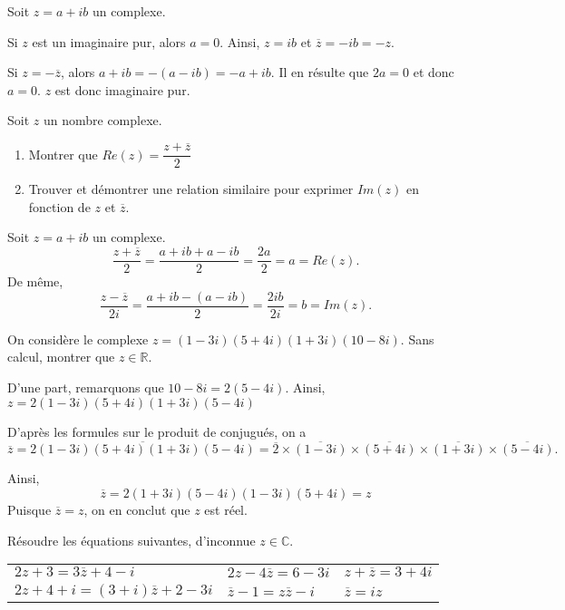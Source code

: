 \documentclass[11pt,fleqn, openany]{book} %
\begin{document}
\begin{solution}Soit \(z=a+ib\) un complexe.

Si \(z\) est un imaginaire pur, alors \(a=0\). Ainsi, \(z=ib\) et \(\overline{z}=-ib=-z\).

Si \(z=-\overline{z}\), alors \(a+ib=-(a-ib)=-a+ib\). Il en résulte que \(2a=0\) et donc \(a=0\). \(z\) est donc imaginaire pur.\end{solution}

\begin{exercise}[topic=cpx02]Soit $z$ un nombre complexe.
\begin{enumerate}
\item Montrer que $Re(z)=\dfrac{z+\overline{z}}{2}$
\item Trouver et démontrer une relation similaire pour exprimer $Im(z)$ en fonction de $z$ et $\overline{z}$.
\end{enumerate}\end{exercise}

\begin{solution}
Soit \(z=a+ib\) un complexe.
\[\dfrac{z+\overline{z}}{2}=\dfrac{a+ib+a-ib}{2}=\dfrac{2a}{2}=a=Re(z).\]
De même,
\[\dfrac{z-\overline{z}}{2i}=\dfrac{a+ib-(a-ib)}{2}=\dfrac{2ib}{2i}=b=Im(z).\]
\end{solution}

\begin{exercise}[topic=cpx02]On considère le complexe $z=(1-3i)(5+4i)(1+3i)(10-8i)$. Sans calcul, montrer que $z\in\mathbb{R}$.\end{exercise}

\begin{solution}D'une part, remarquons que \(10-8i=2(5-4i)\). Ainsi, \(z=2(1-3i)(5+4i)(1+3i)(5-4i)\)

D'après les formules sur le produit de conjugués, on a
\[\overline{z}=\overline{2(1-3i)(5+4i)(1+3i)(5-4i)}=\overline{2}\times\overline{(1-3i)} \times \overline{(5+4i)} \times \overline{(1+3i)} \times \overline{(5-4i)}.\]

Ainsi,
\[\overline{z}=2(1+3i)(5-4i)(1-3i)(5+4i)=z\]
Puisque \(\overline{z}=z\), on en conclut que \(z\) est réel.\end{solution}


\begin{exercise}[topic=cpx02]Résoudre les équations suivantes, d'inconnue $z\in\mathbb{C}$.

\begin{tabularx}{\linewidth}{XXX}
$2z+3=3\overline{z}+4-i$ & $2z-4\overline{z}= 6-3i$ & $z+\overline{z}=3+4i$ \\

$2z+4+i=(3+i)\overline{z}+2-3i$  &  $\overline{z}-1=z\overline{z}-i$ & $\overline{z}=iz$

\end{tabularx}\end{exercise}
\end{document}
